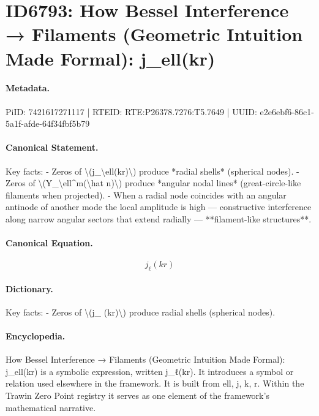 \section*{ID6793: How Bessel Interference → Filaments (Geometric Intuition Made Formal): j\_ell(kr)}
\paragraph{Metadata.}
PiID: 7421617271117 | RTEID: RTE:P26378.7276:T5.7649 | UUID: e2e6ebf6-86c1-5a1f-afde-64f34fbf5b79

\paragraph{Canonical Statement.}
Key facts: - Zeros of \textbackslash{}(j\_\textbackslash{}ell(kr)\textbackslash{}) produce *radial shells* (spherical nodes). - Zeros of \textbackslash{}(Y\_\textbackslash{}ell\textasciicircum{}m(\textbackslash{}hat n)\textbackslash{}) produce *angular nodal lines* (great-circle-like filaments when projected). - When a radial node coincides with an angular antinode of another mode the local amplitude is high — constructive interference along narrow angular sectors that extend radially — **filament-like structures**.

\paragraph{Canonical Equation.}
\[
j_\ell(kr)
\]

\paragraph{Dictionary.}
Key facts: - Zeros of \textbackslash{}(j\_ (kr)\textbackslash{}) produce radial shells (spherical nodes).

\paragraph{Encyclopedia.}
How Bessel Interference → Filaments (Geometric Intuition Made Formal): j\_ell(kr) is a symbolic expression, written j\_ℓ(kr). It introduces a symbol or relation used elsewhere in the framework. It is built from ell, j, k, r. Within the Trawin Zero Point registry it serves as one element of the framework's mathematical narrative.
